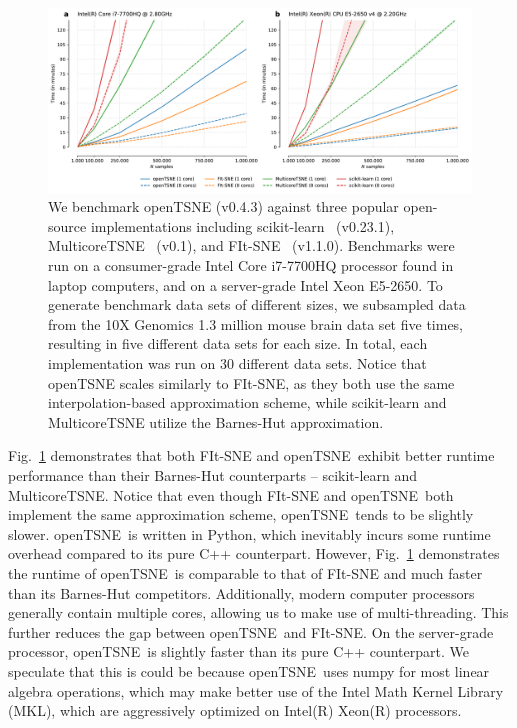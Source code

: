 \documentclass[twocolumn]{bmcart}
\newcommand{\opentsne}{\textsf{openTSNE}}
\begin{document}
\begin{figure}[htbp]
  \includegraphics[width=\textwidth]{benchmarks}
  \caption{\label{fig:benchmarks}We benchmark openTSNE (v0.4.3) against three popular open-source implementations including scikit-learn~\cite{pedregosa2011scikit} (v0.23.1), MulticoreTSNE~\cite{Ulyanov2016} (v0.1), and FIt-SNE~\cite{linderman2019fast} (v1.1.0). Benchmarks were run on a consumer-grade Intel Core i7-7700HQ processor found in laptop computers, and on a server-grade Intel Xeon E5-2650. To generate benchmark data sets of different sizes, we subsampled data from the 10X Genomics 1.3 million mouse brain data set five times, resulting in five different data sets for each size. In total, each implementation was run on 30 different data sets. Notice that openTSNE scales similarly to FIt-SNE, as they both use the same interpolation-based approximation scheme, while scikit-learn and MulticoreTSNE utilize the Barnes-Hut approximation.}
\end{figure}

Fig.~\ref{fig:benchmarks} demonstrates that both \textsf{FIt-SNE} and \opentsne\ exhibit better runtime performance than their Barnes-Hut counterparts -- \textsf{scikit-learn} and \textsf{MulticoreTSNE}. Notice that even though \textsf{FIt-SNE} and \opentsne\ both implement the same approximation scheme, \opentsne\ tends to be slightly slower. \opentsne\ is written in Python, which inevitably incurs some runtime overhead compared to its pure C++ counterpart. However, Fig.~\ref{fig:benchmarks} demonstrates the runtime of \opentsne\ is comparable to that of \textsf{FIt-SNE} and much faster than its Barnes-Hut competitors. Additionally, modern computer processors generally contain multiple cores, allowing us to make use of multi-threading. This further reduces the gap between \opentsne\ and \textsf{FIt-SNE}. On the server-grade processor, \opentsne\ is slightly faster than its pure C++ counterpart. We speculate that this is could be because \opentsne\ uses \textsf{numpy} for most linear algebra operations, which may make better use of the Intel Math Kernel Library (MKL), which are aggressively optimized on Intel(R) Xeon(R) processors.
\end{document}
